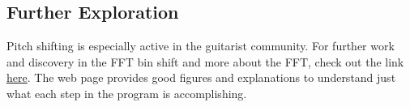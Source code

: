 \subsection{Further Exploration}
Pitch shifting is especially active in the guitarist community. For further work and discovery in the FFT bin shift and more about the FFT, check out the link 
\href{http://www.guitarpitchshifter.com/algorithm.html}{here}. 
The web page provides good figures and explanations to understand just what each step in the program is accomplishing.
